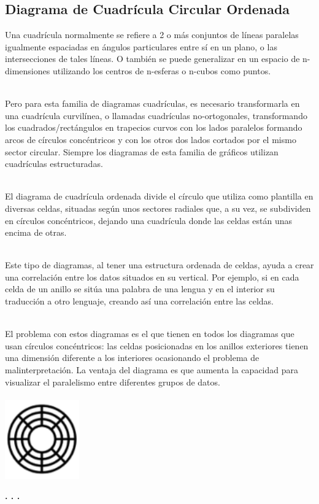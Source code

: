 \documentclass{article}\usepackage[]{graphicx}\usepackage[]{color}
\begin{document}
\subsection{Diagrama de Cuadr\'icula Circular Ordenada}
Una cuadr\'icula normalmente se refiere a 2 o m\'as conjuntos de l\'ineas paralelas igualmente espaciadas en \'angulos particulares entre s\'i en un plano, o las intersecciones de tales l\'ineas. O tambi\'en se puede generalizar en un espacio de n-dimensiones utilizando los centros de n-esferas o n-cubos como puntos\cite{mat-grid}.~\\~\par
Pero para esta familia de diagramas cuadr\'iculas, es necesario transformarla en una cuadr\'icula curvil\'inea, o llamadas cuadr\'iculas no-ortogonales, transformando los cuadrados/rect\'angulos en trapecios curvos con los lados paralelos formando arcos de c\'irculos conc\'entricos y con los otros dos lados cortados por el mismo sector circular\cite{grid-book}. Siempre los diagramas de esta familia de gr\'aficos utilizan cuadr\'iculas estructuradas.~\\~\par
El diagrama de cuadr\'icula ordenada divide el c\'irculo que utiliza como plantilla en diversas celdas, situadas seg\'un unos sectores radiales que, a su vez, se subdividen en c\'irculos conc\'entricos, dejando una cuadr\'icula donde las celdas est\'an unas encima de otras.~\\~\par
Este tipo de diagramas, al tener una estructura ordenada de celdas, ayuda a crear una correlaci\'on entre los datos situados en su vertical. Por ejemplo, si en cada celda de un anillo se sit\'ua una palabra de una lengua y en el interior su traducci\'on a otro lenguaje, creando as\'i una correlaci\'on entre las celdas.~\\~\par
El problema con estos diagramas es el que tienen en todos los diagramas que usan c\'irculos conc\'entricos: las celdas posicionadas en los anillos exteriores tienen una dimensi\'on diferente a los interiores ocasionando el problema de malinterpretaci\'on. La ventaja del diagrama es que aumenta la capacidad para visualizar el paralelismo entre diferentes grupos de datos.
~\\~\\
\vbox{
    \centering
    \includegraphics[width=0.24\textwidth]{imag/cu_ord}
}
\begin{center}
\textbf{. . .}
\end{center}
\end{document}
